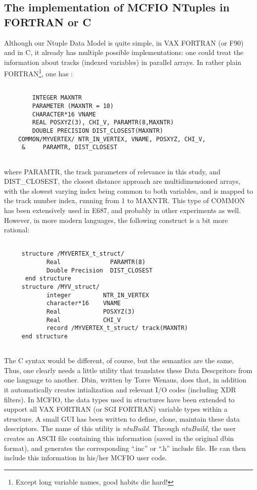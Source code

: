 \subsection{The implementation of MCFIO NTuples in FORTRAN or C}


Although our Ntuple Data Model is quite simple, in VAX FORTRAN (or F90) 
and in C, it already has multiple possible implementations: one could treat 
the information about tracks (indexed variables) in parallel arrays.  In 
rather plain FORTRAN\footnote{Except long variable names, good habits die
hard!}, one has : 
\begin{verbatim}

        INTEGER MAXNTR
        PARAMETER (MAXNTR = 10)
        CHARACTER*16 VNAME
        REAL POSXYZ(3), CHI_V, PARAMTR(8,MAXNTR)
        DOUBLE PRECISION DIST_CLOSEST(MAXNTR) 
	COMMON/MYVERTEX/ NTR_IN_VERTEX, VNAME, POSXYZ, CHI_V, 
     &     PARAMTR, DIST_CLOSEST
     
\end{verbatim}     
where PARAMTR, the track parameters of relevance in this study, and 
DIST\_CLOSEST, the closest distance approach are multidimensioned arrays, with 
the slowest varying index being common to both variables, and is  mapped to the
track number index, running from 1 to MAXNTR.  This type of COMMON has been 
extensively used in E687, and probably in other experiments as well.  However,
in more modern languages, the following construct is a bit  more rational:

\begin{verbatim}

     structure /MYVERTEX_t_struct/
            Real              PARAMTR(8)
            Double Precision  DIST_CLOSEST
      end structure
     structure /MYV_struct/
            integer         NTR_IN_VERTEX 
            character*16    VNAME
            Real            POSXYZ(3)
            Real            CHI_V 
            record /MYVERTEX_t_struct/ track(MAXNTR) 
     end structure
     
\end{verbatim}     

The C syntax would be different, of course, but the semantics are the same,
Thus, one clearly needs a little utility that translates these Data 
Descpritors from one language to another. Dbin, written by Torre Wenaus,  does
that, in addition it automatically creates intialization and relevant I/O codes
(including XDR filters).  In MCFIO, the data types used in structures have been
extended to support all VAX FORTRAN (or SGI FORTRAN) variable types within a
structure.  A small GUI has been written to define, clone,  maintain these
data descriptors.  The name of this utility is {\em ntuBuild}. 
 Through {\em ntuBuild}, the user creates an ASCII file
containing this information  (saved in the original dbin format), and generates
the corresponding ``.inc''  or ``.h'' include file. He can then include this
information in his/her MCFIO user code.  

